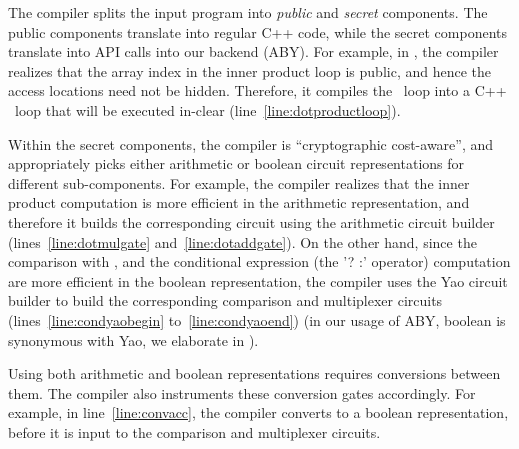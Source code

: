 The compiler splits the input
program into \emph{public} and \emph{secret} components. The public
components translate into regular C++ code, while the secret
components translate into API calls into our \mpc backend
(ABY). For example, in , the \tool
compiler realizes that the array index  in the inner product loop
is public, and hence the access locations need not be hidden.
Therefore, it compiles the ~loop into a C++
~loop that will be executed in-clear
(line~\ref{line:dotproductloop}).

Within the secret components, the \tool compiler is ``cryptographic
cost-aware'', and appropriately picks either arithmetic or boolean
circuit representations for different sub-components. For example,
the compiler realizes that the inner product computation is more
efficient in the arithmetic representation, and therefore it builds
the corresponding circuit using the arithmetic circuit builder
 (lines~\ref{line:dotmulgate} and~\ref{line:dotaddgate}). On
the other hand, since the comparison with , and the conditional
expression (the '? :' operator) computation are more efficient in the
boolean representation, the \tool compiler uses the Yao circuit
builder  to build the corresponding comparison and
multiplexer circuits
(lines~\ref{line:condyaobegin} to~\ref{line:condyaoend}) (in our usage
of ABY, boolean is synonymous with Yao, we elaborate in
).


Using both arithmetic and boolean representations requires conversions between them.
The \tool compiler also
instruments these conversion gates accordingly. For example, in
line~\ref{line:convacc}, the compiler converts
 to a boolean representation, before it is
input to the comparison and multiplexer circuits.

